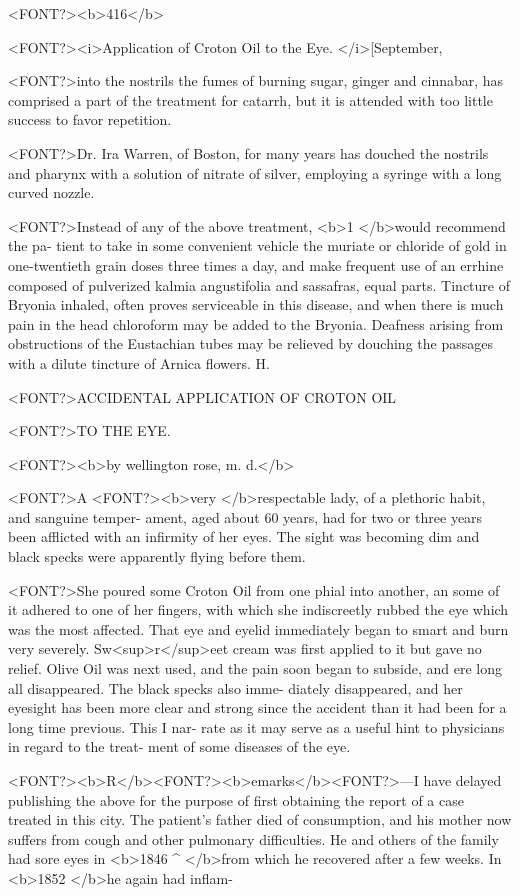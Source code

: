 <FONT?><b>416</b>

<FONT?><i>Application of Croton Oil to the Eye. </i>[September,

<FONT?>into the nostrils the fumes of burning sugar, ginger and cinnabar,
has comprised a part of the treatment for catarrh, but it is attended
with too little success to favor repetition.

<FONT?>Dr. Ira Warren, of Boston, for many years has douched the nostrils
and pharynx with a solution of nitrate of silver, employing a syringe
with a long curved nozzle.

<FONT?>Instead of any of the above treatment, <b>1 </b>would recommend the pa-
tient to take in some convenient vehicle the muriate or chloride of gold
in one-twentieth grain doses three times a day, and make frequent use
of an errhine composed of pulverized kalmia angustifolia and sassafras,
equal parts. Tincture of Bryonia inhaled, often proves serviceable in
this disease, and when there is much pain in the head chloroform may
be added to the Bryonia. Deafness arising from obstructions of the
Eustachian tubes may be relieved by douching the passages with a dilute
tincture of Arnica flowers. H.

<FONT?>ACCIDENTAL APPLICATION OF CROTON OIL

<FONT?>TO THE EYE.

<FONT?><b>by wellington rose, m. d.</b>

<FONT?>A <FONT?><b>very </b>respectable lady, of a plethoric habit, and sanguine temper-
ament, aged about 60 years, had for two or three years been afflicted
with an infirmity of her eyes. The sight was becoming dim and black
specks were apparently flying before them.

<FONT?>She poured some Croton Oil from one phial into another, an some
of it adhered to one of her fingers, with which she indiscreetly rubbed
the eye which was the most affected. That eye and eyelid immediately
began to smart and burn very severely. Sw<sup>r</sup>eet cream was first applied
to it but gave no relief. Olive Oil was next used, and the pain soon began
to subside, and ere long all disappeared. The black specks also imme-
diately disappeared, and her eyesight has been more clear and strong
since the accident than it had been for a long time previous. This I nar-
rate as it may serve as a useful hint to physicians in regard to the treat-
ment of some diseases of the eye.

<FONT?><b>R</b><FONT?><b>emarks</b><FONT?>---I have delayed publishing the above for the purpose of first
obtaining the report of a case treated in this city. The patient's father
died of consumption, and his mother now suffers from cough and other
pulmonary difficulties. He and others of the family had sore eyes in <b>1846 ^
</b>from which he recovered after a few weeks. In <b>1852 </b>he again had inflam-\endinput
